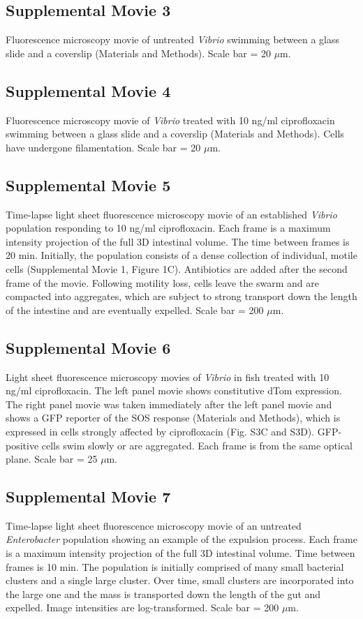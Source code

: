 \subsection*{Supplemental Movie 3}
Fluorescence microscopy movie of untreated \textit{Vibrio} swimming between a glass slide and a coverslip (Materials and Methods). Scale bar = 20 $\mu$m.

\subsection*{Supplemental Movie 4}
Fluorescence microscopy movie of \textit{Vibrio} treated with 10 ng/ml ciprofloxacin swimming between a glass slide and a coverslip (Materials and Methods). Cells have undergone filamentation. Scale bar = 20 $\mu$m.

\subsection*{Supplemental Movie 5}
Time-lapse light sheet fluorescence microscopy movie of an established \textit{Vibrio} population responding to 10 ng/ml ciprofloxacin. Each frame is a maximum intensity projection of the full 3D intestinal volume.  The time between frames is 20 min. Initially, the population consists of a dense collection of individual, motile cells (Supplemental Movie 1, Figure 1C). Antibiotics are added after the second frame of the movie.  Following motility loss, cells leave the swarm and are compacted into aggregates, which are subject to strong transport down the length of the intestine and are eventually expelled. Scale bar = 200 $\mu$m.

\subsection*{Supplemental Movie 6}
Light sheet fluorescence microscopy movies of \textit{Vibrio} in fish treated with 10 ng/ml ciprofloxacin. The left panel movie shows constitutive dTom expression. The right panel movie was taken immediately after the left panel movie and shows a GFP reporter of the SOS response (Materials and Methods), which is expressed in cells strongly affected by ciprofloxacin (Fig. S3C and S3D). GFP-positive cells swim slowly or are aggregated. Each frame is from the same optical plane. Scale bar = 25 $\mu$m. 

\subsection*{Supplemental Movie 7}
Time-lapse light sheet fluorescence microscopy movie of an untreated \textit{Enterobacter} population showing an example of the expulsion process. Each frame is a maximum intensity projection of the full 3D intestinal volume. Time between frames is 10 min. The population is initially comprised of many small bacterial clusters and a single large cluster. Over time, small clusters are incorporated into the large one and the mass is transported down the length of the gut and expelled. Image intensities are log-transformed. Scale bar = 200 $\mu$m.


